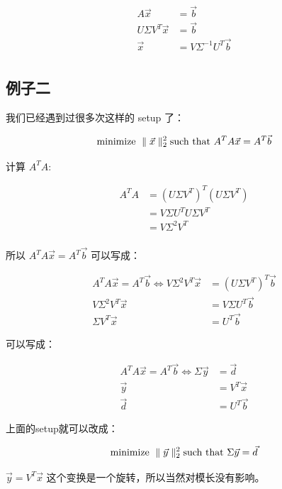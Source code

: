\documentclass[
]{book}
\begin{document}
\[
\begin{aligned}
A\vec{x} {}
&= \vec{b} \\
U \Sigma V^T \vec{x} &= \vec{b}\\
\vec{x} &= V \Sigma^{-1} U^T \vec{b}  \\
\end{aligned}
\]

\hypertarget{ux4f8bux5b50ux4e8c}{%
\subsection{例子二}\label{ux4f8bux5b50ux4e8c}}

我们已经遇到过很多次这样的 setup 了：

\[
\text{minimize } \parallel \vec{x}\parallel _2^2 \\
\text{such that  } A^TA\vec{x} = A^T \vec{b}
\]

计算 \(A^TA\):

\[
\begin{aligned}
A^T A {}
&= (U \Sigma V^T)^T(U \Sigma V^T) \\
&= V \Sigma U^T U \Sigma V^T\\
&= V \Sigma^2 V^T \\
\end{aligned}
\]

所以 \(A^TA \vec{x} = A^T \vec{b}\) 可以写成：

\[
\begin{aligned}
A^TA \vec{x} = A^T \vec{b}  \iff V \Sigma^2 V^T \vec{x} &= (U \Sigma V^T)^T \vec{b}\\ {}
V \Sigma^2 V^T \vec{x} &= V \Sigma U^T \vec{b} \\
\Sigma V^T \vec{x} &=  U^T \vec{b}
\end{aligned}
\]

可以写成：

\[
\begin{aligned}
A^TA \vec{x} = A^T \vec{b}  \iff \Sigma \vec{y} &= \vec{d} \\ {}
\vec{y} &= V^T \vec{x} \\
\vec{d} &=  U^T \vec{b}
\end{aligned}
\]

上面的setup就可以改成：

\[
\text{minimize } \parallel \vec{y}\parallel _2^2 \\
\text{such that  } \Sigma \vec{y} =  \vec{d}
\]

\(\vec{y} = V^T \vec{x}\) 这个变换是一个旋转，所以当然对模长没有影响。
\end{document}
